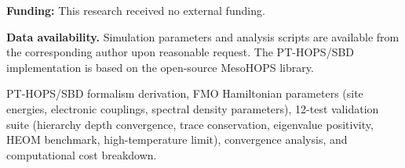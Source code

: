 \documentclass[journal=jpcl,manuscript=letter]{achemso}
\begin{document}
\vspace{1ex}
\noindent\textbf{Funding:} This research received no external funding.


\textbf{Data availability.} Simulation parameters and analysis scripts are available from the corresponding author upon reasonable request. The PT-HOPS/SBD implementation is based on the open-source MesoHOPS library.


\begin{suppinfo}
PT-HOPS/SBD formalism derivation, FMO Hamiltonian parameters (site energies, electronic couplings, spectral density parameters), 12-test validation suite (hierarchy depth convergence, trace conservation, eigenvalue positivity, HEOM benchmark, high-temperature limit), convergence analysis, and computational cost breakdown.
\end{suppinfo}



\end{document}
